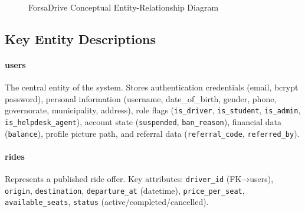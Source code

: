 \documentclass[12pt,a4paper,openright]{report}
\begin{document}
\begin{figure}[H]
\centering
{}
\caption{ForsaDrive Conceptual Entity-Relationship Diagram}
\label{fig:erd}
\end{figure}

\subsection{Key Entity Descriptions}

\paragraph{users} The central entity of the system. Stores authentication credentials (email, bcrypt password), personal information (username, date\_of\_birth, gender, phone, governorate, municipality, address), role flags (\texttt{is\_driver}, \texttt{is\_student}, \texttt{is\_admin}, \texttt{is\_helpdesk\_agent}), account state (\texttt{suspended}, \texttt{ban\_reason}), financial data (\texttt{balance}), profile picture path, and referral data (\texttt{referral\_code}, \texttt{referred\_by}).

\paragraph{rides} Represents a published ride offer. Key attributes: \texttt{driver\_id} (FK→users), \texttt{origin}, \texttt{destination}, \texttt{departure\_at} (datetime), \texttt{price\_per\_seat}, \texttt{available\_seats}, \texttt{status} (active/completed/cancelled).
\end{document}
